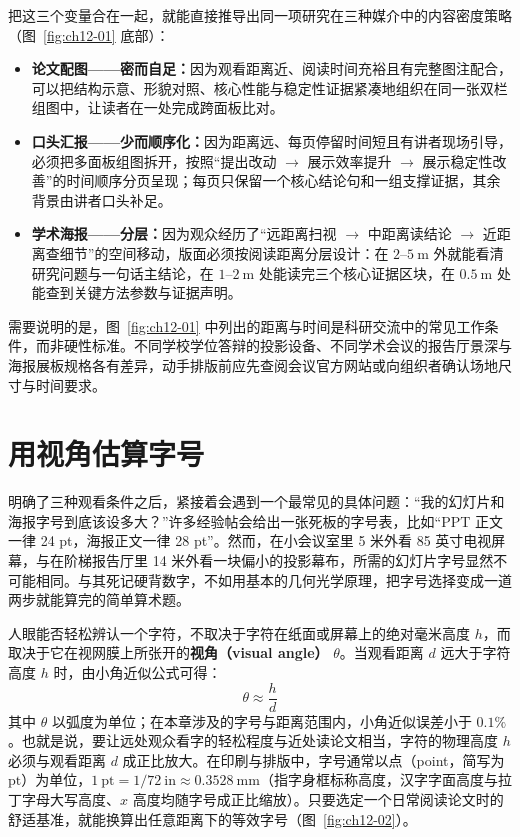 把这三个变量合在一起，就能直接推导出同一项研究在三种媒介中的内容密度策略（图~\ref{fig:ch12-01} 底部）：
\begin{itemize}
\item \textbf{论文配图——密而自足：}因为观看距离近、阅读时间充裕且有完整图注配合，可以把结构示意、形貌对照、核心性能与稳定性证据紧凑地组织在同一张双栏组图中，让读者在一处完成跨面板比对。
\item \textbf{口头汇报——少而顺序化：}因为距离远、每页停留时间短且有讲者现场引导，必须把多面板组图拆开，按照“提出改动 $\rightarrow$ 展示效率提升 $\rightarrow$ 展示稳定性改善”的时间顺序分页呈现；每页只保留一个核心结论句和一组支撑证据，其余背景由讲者口头补足。
\item \textbf{学术海报——分层：}因为观众经历了“远距离扫视 $\rightarrow$ 中距离读结论 $\rightarrow$ 近距离查细节”的空间移动，版面必须按阅读距离分层设计：在 $2\text{--}5\ \text{m}$ 外就能看清研究问题与一句话主结论，在 $1\text{--}2\ \text{m}$ 处能读完三个核心证据区块，在 $0.5\ \text{m}$ 处能查到关键方法参数与证据声明。
\end{itemize}

需要说明的是，图~\ref{fig:ch12-01} 中列出的距离与时间是科研交流中的常见工作条件，而非硬性标准。不同学校学位答辩的投影设备、不同学术会议的报告厅景深与海报展板规格各有差异，动手排版前应先查阅会议官方网站或向组织者确认场地尺寸与时间要求。

\section{用视角估算字号}

明确了三种观看条件之后，紧接着会遇到一个最常见的具体问题：“我的幻灯片和海报字号到底该设多大？”许多经验帖会给出一张死板的字号表，比如“PPT 正文一律 24 pt，海报正文一律 28 pt”。然而，在小会议室里 5 米外看 85 英寸电视屏幕，与在阶梯报告厅里 14 米外看一块偏小的投影幕布，所需的幻灯片字号显然不可能相同。与其死记硬背数字，不如用基本的几何光学原理，把字号选择变成一道两步就能算完的简单算术题。

人眼能否轻松辨认一个字符，不取决于字符在纸面或屏幕上的绝对毫米高度 $h$，而取决于它在视网膜上所张开的\textbf{视角（visual angle）} $\theta$。当观看距离 $d$ 远大于字符高度 $h$ 时，由小角近似公式可得：
\[
\theta \approx \frac{h}{d}
\]
其中 $\theta$ 以弧度为单位；在本章涉及的字号与距离范围内，小角近似误差小于 $0.1\%$。也就是说，要让远处观众看字的轻松程度与近处读论文相当，字符的物理高度 $h$ 必须与观看距离 $d$ 成正比放大。在印刷与排版中，字号通常以点（point，简写为 $\text{pt}$）为单位，$1\ \text{pt} = 1/72\ \text{in} \approx 0.3528\ \text{mm}$（指字身框标称高度，汉字字面高度与拉丁字母大写高度、$x$ 高度均随字号成正比缩放）。只要选定一个日常阅读论文时的舒适基准，就能换算出任意距离下的等效字号（图~\ref{fig:ch12-02}）。

